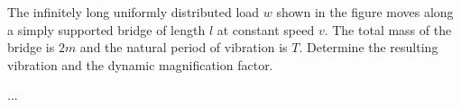 
\begin{Exercise}[label=infinitely_long_udl]
The infinitely long uniformly distributed load $w$ shown in the figure moves along a simply supported bridge of length $l$ at constant speed $v$. The total mass of the bridge is $2m$ and the natural period of vibration is $T$. Determine the resulting vibration and the dynamic magnification factor.

\begin{center}
\end{center}

\shortAnswer ...
\end{Exercise}




